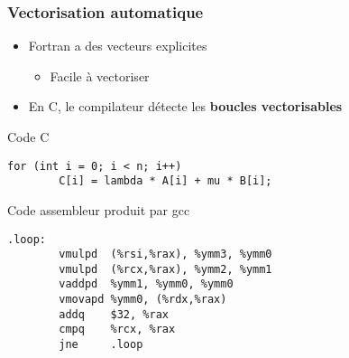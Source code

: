 \documentclass[xcolor={x11names,svgnames}]{beamer}
\begin{document}
\begin{frame}[fragile=singleslide]
  \frametitle{Vectorisation automatique}

  \begin{itemize}
  \item Fortran a des vecteurs explicites
    \begin{itemize}
    \item Facile à vectoriser
    \end{itemize}
    \item En C, le compilateur détecte les \textbf{boucles vectorisables}

  \end{itemize}

\begin{exampleblock}{Code C}
\begin{verbatim}
for (int i = 0; i < n; i++)
        C[i] = lambda * A[i] + mu * B[i];
\end{verbatim}
\end{exampleblock}

\begin{alertblock}{Code assembleur produit par gcc}

\begin{verbatim}
.loop:
        vmulpd  (%rsi,%rax), %ymm3, %ymm0    
        vmulpd  (%rcx,%rax), %ymm2, %ymm1
        vaddpd  %ymm1, %ymm0, %ymm0
        vmovapd %ymm0, (%rdx,%rax)
        addq    $32, %rax
        cmpq    %rcx, %rax
        jne     .loop
\end{verbatim}
\end{alertblock}%
\end{frame}


\end{document}
